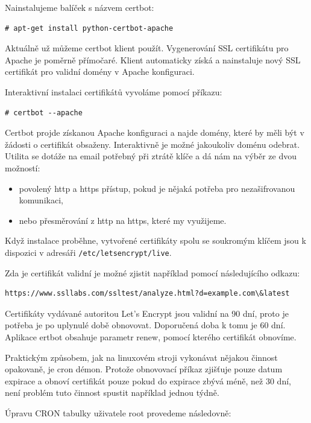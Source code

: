 \documentclass[thesis=B,czech]{FITthesis}[2012/06/26]
\begin{document}
Nainstalujeme balíček s názvem certbot: 

\begin{verbatim}
# apt-get install python-certbot-apache
\end{verbatim}

Aktuálně už můžeme certbot klient použít. Vygenerování SSL certifikátu pro Apache je poměrně přímočaré. Klient automaticky získá a nainstaluje nový SSL certifikát pro validní domény v Apache konfiguraci.

Interaktivní instalaci certifikátů vyvoláme pomocí příkazu:

\begin{verbatim}
# certbot --apache
\end{verbatim}


Certbot projde získanou Apache konfiguraci a najde domény, které by měli být v žádosti o certifikát obsaženy. Interaktivně je možné jakoukoliv doménu odebrat. Utilita se dotáže na email potřebný při ztrátě klíče a dá nám na výběr ze dvou možností: 

\begin{itemize}
\item povolený http a https přístup, pokud je nějaká potřeba pro nezašifrovanou komunikaci,
\item nebo přesměrování z http na https, které my využijeme. 
\end{itemize}

Když instalace proběhne, vytvořené certifikáty spolu se soukromým klíčem jsou k dispozici v adresáři \texttt{/etc/letsencrypt/live}. 

Zda je certifikát validní je možné zjistit například pomocí následujícího odkazu: 

\begin{verbatim}
https://www.ssllabs.com/ssltest/analyze.html?d=example.com\&latest
\end{verbatim}

Certifikáty vydávané autoritou Let's Encrypt jsou validní na 90 dní, proto je potřeba je po uplynulé době obnovovat. Doporučená doba k tomu je 60 dní. Aplikace ertbot obsahuje parametr renew, pomocí kterého certifikát obnovíme. 

Praktickým způsobem, jak na linuxovém stroji vykonávat nějakou činnost opakovaně, je cron démon. Protože obnovovací příkaz zjišťuje pouze datum expirace a obnoví certifikát pouze pokud do expirace zbývá méně, než 30 dní, není problém tuto činnost spustit například jednou týdně.

Úpravu CRON tabulky uživatele root provedeme následovně:
\end{document}
